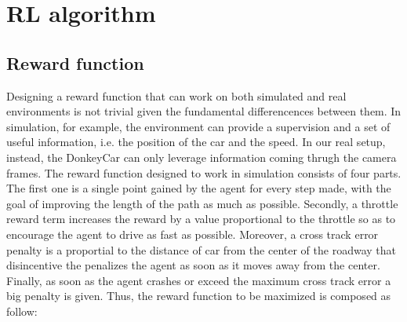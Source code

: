 \begin{center}
    \begin{minipage}{0.9\linewidth}
      
      \end{minipage}
    \begin{minipage}{0.9\linewidth}
      
      \end{minipage}
\end{center}

\section{RL algorithm}

\subsection{Reward function}
Designing a reward function that can work on both simulated and real environments is not trivial given the fundamental differencences between them. In simulation, for example, the environment can provide a supervision and a set of useful information, i.e. the position of the car and the speed. In our real setup, instead, the DonkeyCar can only leverage information coming thrugh the camera frames. The reward function designed to work in simulation consists of four parts. The first one is a single point gained  by the agent for every step made, with the goal of improving the length of the path as much as possible. Secondly, a throttle reward term increases the reward by a value proportional to the throttle so as to encourage the agent to drive as fast as possible. Moreover, a cross track error penalty is a proportial to the distance of car from the center of the roadway that disincentive the penalizes the agent as soon as it moves away from the center. Finally, as soon as the agent crashes or exceed the maximum cross track error a big penalty is given. Thus, the reward function to be maximized is composed as follow:

